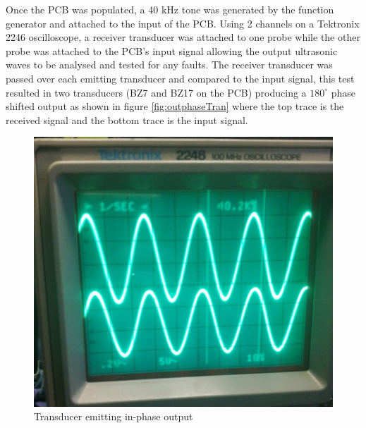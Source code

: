 Once the PCB was populated, a 40 kHz tone was generated by the function generator and attached to the input of the PCB. Using 2 channels on a Tektronix 2246 oscilloscope, a receiver transducer was attached to one probe while the other probe was attached to the PCB's input signal allowing the output ultrasonic waves to be analysed and tested for any faults. The receiver transducer was passed over each emitting transducer and compared to the input signal, this test resulted in two transducers (BZ7 and BZ17 on the PCB) producing a $180^\circ$ phase shifted output as shown in figure \ref{fig:outphaseTran} where the top trace is the received signal and the bottom trace is the input signal.

\begin{figure}[ht!]
\centering

    \begin{minipage}{0.49\textwidth}
    \centering
    \includegraphics[width= \textwidth]{Figures/Implementation/TransducerArray/correctPhase.png}
    \caption{Transducer emitting in-phase output}
    \label{fig:inphaseTran}
    \end{minipage}\hfill
    \begin{minipage}{0.49\textwidth}
    \centering

\end{minipage}
\end{figure}

